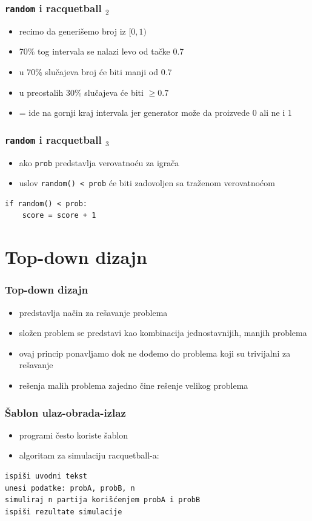 \documentclass[utf8,compress]{beamer}
\begin{document}
\begin{frame}
  \frametitle{\texttt{random} i racquetball $_2$}
  \begin{itemize}
    \item recimo da generišemo broj iz $[0,1)$
    \item 70\% tog intervala se nalazi levo od tačke 0.7
    \item u 70\% slučajeva broj će biti manji od 0.7
    \item u preostalih 30\% slučajeva će biti $\geq 0.7$
    \item = ide na gornji kraj intervala jer generator može da proizvede 0 ali ne i 1
  \end{itemize}
\end{frame}

\begin{frame}[fragile]
  \frametitle{\texttt{random} i racquetball $_3$}
  \begin{itemize}
    \item ako \texttt{prob} predstavlja verovatnoću za igrača
    \item uslov \texttt{random() < prob} će biti zadovoljen sa traženom verovatnoćom
  \end{itemize}
\begin{verbatim}
if random() < prob:
    score = score + 1
\end{verbatim}
\end{frame}

\section[Top-down]{Top-down dizajn}

\begin{frame}
  \frametitle{Top-down dizajn}
  \begin{itemize}
    \item {} predstavlja način za rešavanje problema
    \item složen problem se predstavi kao kombinacija jednostavnijih, manjih problema
    \item ovaj princip ponavljamo dok ne dođemo do problema koji su trivijalni za rešavanje
    \item rešenja malih problema zajedno čine rešenje velikog problema
  \end{itemize}
\end{frame}

\begin{frame}[fragile]
  \frametitle{Šablon ulaz-obrada-izlaz}
  \begin{itemize}
    \item programi često koriste šablon 
    \item algoritam za simulaciju racquetball-a:
  \end{itemize}
\begin{verbatim}
ispiši uvodni tekst
unesi podatke: probA, probB, n
simuliraj n partija korišćenjem probA i probB
ispiši rezultate simulacije
\end{verbatim}
\end{frame}
\end{document}
